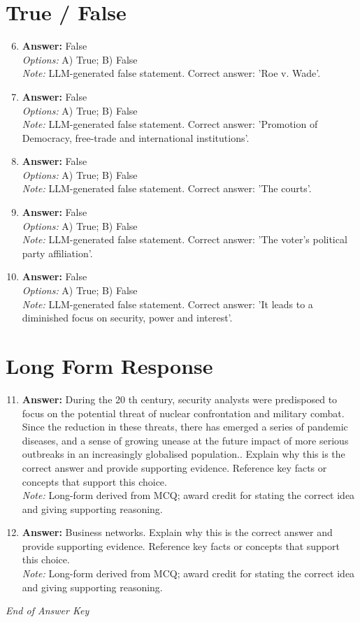 \documentclass[12pt]{article}
\begin{document}
\section*{True / False}
\begin{enumerate}[label=\arabic*.]
\setcounter{enumi}{5}
\item \textbf{Answer:} False
\\ \textit{Options:} A) True; B) False
\\ \textit{Note:} LLM-generated false statement. Correct answer: 'Roe v. Wade'.
\item \textbf{Answer:} False
\\ \textit{Options:} A) True; B) False
\\ \textit{Note:} LLM-generated false statement. Correct answer: 'Promotion of Democracy, free-trade and international institutions'.
\item \textbf{Answer:} False
\\ \textit{Options:} A) True; B) False
\\ \textit{Note:} LLM-generated false statement. Correct answer: 'The courts'.
\item \textbf{Answer:} False
\\ \textit{Options:} A) True; B) False
\\ \textit{Note:} LLM-generated false statement. Correct answer: 'The voter's political party affiliation'.
\item \textbf{Answer:} False
\\ \textit{Options:} A) True; B) False
\\ \textit{Note:} LLM-generated false statement. Correct answer: 'It leads to a diminished focus on security, power and interest'.
\end{enumerate}

\section*{Long Form Response}
\begin{enumerate}[label=\arabic*.]
\setcounter{enumi}{10}
\item \textbf{Answer:} During the 20 th century, security analysts were predisposed to focus on the potential threat of nuclear confrontation and military combat. Since the reduction in these threats, there has emerged a series of pandemic diseases, and a sense of growing unease at the future impact of more serious outbreaks in an increasingly globalised population.. Explain why this is the correct answer and provide supporting evidence. Reference key facts or concepts that support this choice.
\\ \textit{Note:} Long-form derived from MCQ; award credit for stating the correct idea and giving supporting reasoning.
\item \textbf{Answer:} Business networks. Explain why this is the correct answer and provide supporting evidence. Reference key facts or concepts that support this choice.
\\ \textit{Note:} Long-form derived from MCQ; award credit for stating the correct idea and giving supporting reasoning.
\end{enumerate}

\vfill
\noindent\textit{End of Answer Key}
\end{document}
